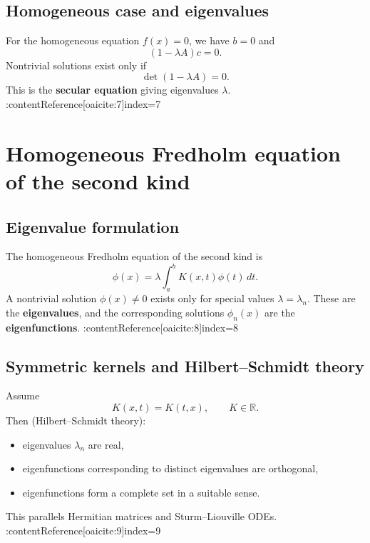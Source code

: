 \subsection{Homogeneous case and eigenvalues}
For the homogeneous equation $f(x)=0$, we have $b=0$ and
\begin{equation}
(1-\lambda A)c=0.
\end{equation}
Nontrivial solutions exist only if
\begin{equation}
\boxed{\det(1-\lambda A)=0.}
\end{equation}
This is the \textbf{secular equation} giving eigenvalues $\lambda$. :contentReference[oaicite:7]{index=7}


\section{Homogeneous Fredholm equation of the second kind}

\subsection{Eigenvalue formulation}
The homogeneous Fredholm equation of the second kind is
\begin{equation}
\boxed{
\phi(x)=\lambda\int_a^b K(x,t)\phi(t)\,dt.
}
\end{equation}
A nontrivial solution $\phi(x)\neq 0$ exists only for special values $\lambda=\lambda_n$.
These are the \textbf{eigenvalues}, and the corresponding solutions $\phi_n(x)$ are
the \textbf{eigenfunctions}. :contentReference[oaicite:8]{index=8}

\subsection{Symmetric kernels and Hilbert--Schmidt theory}
Assume
\begin{equation}
K(x,t)=K(t,x),\qquad K\in\mathbb{R}.
\end{equation}
Then (Hilbert--Schmidt theory):
\begin{itemize}
\item eigenvalues $\lambda_n$ are real,
\item eigenfunctions corresponding to distinct eigenvalues are orthogonal,
\item eigenfunctions form a complete set in a suitable sense.
\end{itemize}
This parallels Hermitian matrices and Sturm--Liouville ODEs. :contentReference[oaicite:9]{index=9}


